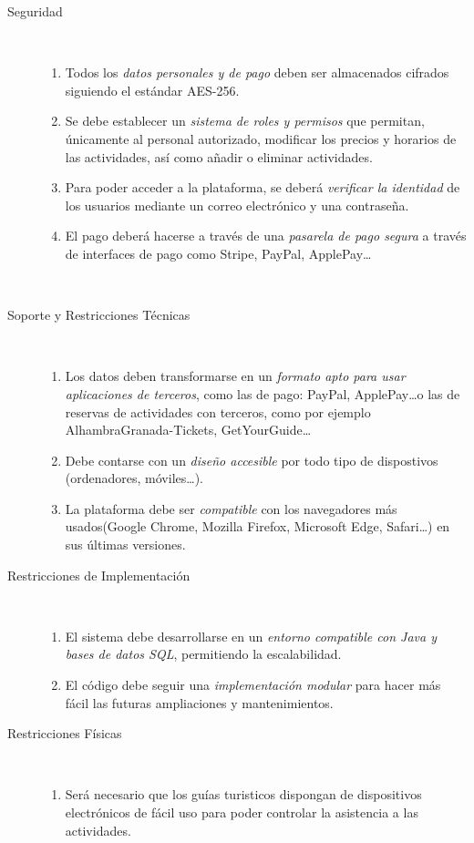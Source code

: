 \begin{description}
    \item[Seguridad]~
    \begin{enumerate}[label={\color{red}RNF-\arabic{enumi}.}, resume]
        \item Todos los \emph{datos personales y de pago} deben ser almacenados cifrados siguiendo el estándar AES-256.
        \item Se debe establecer un \emph{sistema de roles y permisos} que permitan, únicamente al personal autorizado, modificar los precios y horarios de las actividades, así como añadir o eliminar actividades.
        \item Para poder acceder a la plataforma, se deberá \emph{verificar la identidad} de los usuarios mediante un correo electrónico y una contraseña.
        \item El pago deberá hacerse a través de una \emph{pasarela de pago segura} a través de interfaces de pago como Stripe, PayPal, ApplePay\dots
    \end{enumerate}~\\

    \item[Soporte y Restricciones Técnicas]~
    \begin{enumerate}[label={\color{red}RNF-\arabic{enumi}.}, resume]
        \item Los datos deben transformarse en un \emph{formato apto para usar aplicaciones de terceros}, como las de pago: PayPal, ApplePay\dots o las de reservas de actividades con terceros, como por ejemplo AlhambraGranada-Tickets, GetYourGuide\dots
        \item Debe contarse con un \emph{diseño accesible} por todo tipo de dispostivos (ordenadores, móviles\dots).
        \item La plataforma debe ser \emph{compatible} con los navegadores más usados(Google Chrome, Mozilla Firefox, Microsoft Edge, Safari\dots) en sus últimas versiones.
    \end{enumerate}

    \item[Restricciones de Implementación]~
    \begin{enumerate}[label={\color{red}RNF-\arabic{enumi}.}, resume]   
        \item El sistema debe desarrollarse en un \emph{entorno compatible con Java y bases de datos SQL}, permitiendo la escalabilidad.
        \item El código debe seguir una \emph{implementación modular} para hacer más fácil las futuras ampliaciones y mantenimientos.
    \end{enumerate}

    \item[Restricciones Físicas]~
    \begin{enumerate}[label={\color{red}RNF-\arabic{enumi}.}, resume]   
        \item Será necesario que los guías turisticos dispongan de dispositivos electrónicos de fácil uso para poder controlar la asistencia a las actividades.
    \end{enumerate}
\end{description}


\begin{comment}
    El glosario, o a Glosario.tex (asegurandose de que nadie toca), o aquí en sucio y luego se pasará

    Pasarela de pago
\end{comment}

